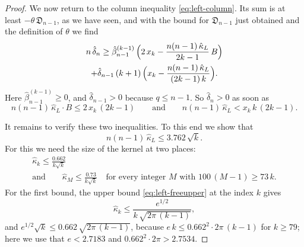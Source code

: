 \documentclass{amsart}
\theoremstyle{definition}
\theoremstyle{remark}
\numberwithin{equation}{section}
\begin{document}
\begin{proof}
We now return to the column inequality \eqref{eq:left-column}. Its sum is at least $-\theta\,\mathfrak D_{n-1}$, as we have seen, and with the bound for $\mathfrak D_{n-1}$ just obtained and the definition of $\theta$ we find
\begin{multline*}
n\,\hat\delta_n\ge\hat\beta^{(k-1)}_{n-1}\,\Bigl(2\,x_k-\frac{n(n-1)\,\hat\kappa_L}{2k-1}\,B\Bigr)\\
+\hat\delta_{n-1}\,(k+1)\,\Bigl(x_k-\frac{n(n-1)\,\hat\kappa_L}{(2k-1)\,k}\Bigr).
\end{multline*}
Here $\hat\beta^{(k-1)}_{n-1}\ge 0$, and $\hat\delta_{n-1}>0$ because $q\le n-1$. So $\hat\delta_n>0$ as soon as
\begin{equation}\label{eq:left-conditions}
n(n-1)\,\hat\kappa_L\cdot B\le 2\,x_k\,(2k-1)\qquad\text{and}\qquad n(n-1)\,\hat\kappa_L<x_k\,k\,(2k-1).
\end{equation}

It remains to verify these two inequalities. To this end we show that
\[
n(n-1)\,\hat\kappa_L\le 3.762\,\sqrt k .
\]
For this we need the size of the kernel at two places:
\[
\begin{gathered}
\hat\kappa_k\le\frac{0.662}{k\sqrt k}\\
\text{and}\qquad\hat\kappa_M\le\frac{0.73}{k\sqrt k}\quad\text{for every integer $M$ with } 100\,(M-1)\ge 73\,k .
\end{gathered}
\]
For the first bound, the upper bound \eqref{eq:left-freeupper} at the index $k$ gives
\[
\hat\kappa_k\le\frac{e^{1/2}}{k\,\sqrt{2\pi\,(k-1)}},
\]
and $e^{1/2}\sqrt k\le 0.662\,\sqrt{2\pi\,(k-1)}$, because $e\,k\le 0.662^2\cdot 2\pi\,(k-1)$ for $k\ge 79$; here we use that $e<2.7183$ and $0.662^2\cdot 2\pi>2.7534$.


\end{proof}
\end{document}
